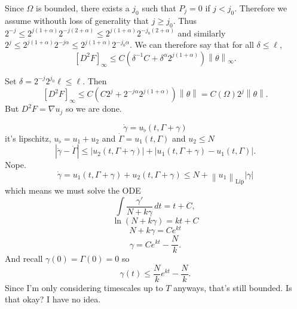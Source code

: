 \documentclass[11pt]{amsart}
\theoremstyle{remark}
\newcommand{\norm}[1]{\left\lVert#1\right\rVert}
\newcommand{\paren}[1]{\left( #1 \right)}
\newcommand{\bracket}[1]{\left[ #1 \right]}
\newcommand{\grad}{\nabla}
\newcommand{\Lip}{\text{Lip}}
\newcommand{\n}{^{-1}}
\newcommand{\ulow}{u_\flat}
\begin{document}
Since $\Omega$ is bounded, there exists a $j_0$ such that $P_j = 0$ if $j < j_0$.  Therefore we assume withouth loss of generality that $j \geq j_0$.  Thus $2^{-j} \leq 2^{j(1+\alpha)} 2^{-j(2+\alpha)} \leq 2^{j(1+\alpha)} 2^{-j_0(2+\alpha)}$ and similarly $2^j \leq 2^{j(1+\alpha)}2^{-j\alpha} \leq 2^{j(1+\alpha)} 2^{-j_0\alpha}$.  We can therefore say that for all $\delta \leq \ell$,
\[ \bracket{D^2 F}_\infty \leq C \paren{\delta\n C + \delta^\alpha 2^{j(1+\alpha)}} \norm{\theta}_\infty. \]

Set $\delta = 2^{-j} 2^{j_0} \ell \leq \ell$.  Then
\[ \bracket{D^2 F}_\infty \leq C \paren{C 2^j + 2^{-j\alpha} 2^{j(1+\alpha)}} \norm{\theta} = C(\Omega) 2^j \norm{\theta}. \]
But $D^2 F = \grad u_j$ so we are done.  





\[ \dot{\gamma} = \ulow(t,\Gamma + \gamma) \]
it's lipschitz, $\ulow = u_1 + u_2$ and $\dot{\Gamma} = u_1(t,\Gamma)$ and $u_2 \leq N$
\[ |\dot{\gamma} - \dot{\Gamma}| \leq |u_2(t,\Gamma + \gamma)| + |u_1(t,\Gamma+\gamma) - u_1(t,\Gamma)|. \]
Nope.  
\[ \dot{\gamma} = u_1(t,\Gamma + \gamma) + u_2(t,\Gamma + \gamma) \leq N + \norm{u_1}_\Lip |\gamma| \]
which means we must solve the ODE
\[ \int \frac{\gamma'}{N + k \gamma} \,dt = t + C, \]
\[ \ln(N+k \gamma) = k t + C \]
\[ N + k \gamma = C e^{k t} \]
\[ \gamma = C e^{k t} - \frac{N}{k}. \]
And recall $\gamma(0)=\Gamma(0) = 0$ so
\[ \gamma(t) \leq \frac{N}{k} e^{kt} - \frac{N}{k}. \]
Since I'm only considering timescales up to $T$ anyways, that's still bounded.  Is that okay?  I have no idea.  
\end{document}
